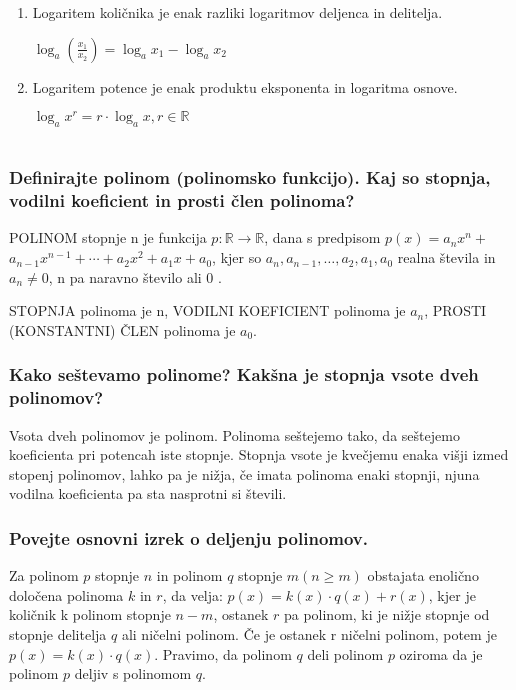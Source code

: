 \documentclass{article}
\begin{document}
\begin{enumerate}
  \item Logaritem količnika je enak razliki logaritmov deljenca in delitelja.

$\log _{a}\left(\frac{x_{1}}{x_{2}}\right)=\log _{a} x_{1}-\log _{a} x_{2}$

  \item Logaritem potence je enak produktu eksponenta in logaritma osnove.

  $\log _{a} x^{r}=r \cdot \log _{a} x, r \in \mathbb{R}$
\end{enumerate}

\section{\texorpdfstring{}{Polinomi}}
\subsubsection*{Definirajte polinom (polinomsko funkcijo). Kaj so stopnja, vodilni koeficient in prosti člen polinoma?}

POLINOM stopnje $\mathrm{n}$ je funkcija $p: \mathbb{R} \rightarrow \mathbb{R}$, dana s predpisom $p(x)=a_{n} x^{n}+$ $a_{n-1} x^{n-1}+\cdots+a_{2} x^{2}+a_{1} x+a_{0}$, kjer so $a_{n}, a_{n-1}, \ldots, a_{2}, a_{1}, a_{0}$ realna števila in $a_{n} \neq 0$, n pa naravno število ali 0 .

STOPNJA polinoma je $\mathrm{n}$, VODILNI KOEFICIENT polinoma je $a_{n}$, PROSTI (KONSTANTNI) ČLEN polinoma je $a_{0}$.

\subsubsection*{Kako seštevamo polinome? Kakšna je stopnja vsote dveh polinomov?}

Vsota dveh polinomov je polinom. Polinoma seštejemo tako, da seštejemo koeficienta pri potencah iste stopnje. Stopnja vsote je kvečjemu enaka višji izmed stopenj polinomov, lahko pa je nižja, če imata polinoma enaki stopnji, njuna vodilna koeficienta pa sta nasprotni si števili.

\subsubsection*{Povejte osnovni izrek o deljenju polinomov.}

Za polinom $p$ stopnje $n$ in polinom $q$ stopnje $m(n \geq m)$ obstajata enolično določena polinoma $k$ in $r$, da velja: $p(x)=k(x) \cdot q(x)+r(x)$, kjer je količnik k polinom stopnje $n-m$, ostanek $r$ pa polinom, ki je nižje stopnje od stopnje delitelja $q$ ali ničelni polinom. Če je ostanek r ničelni polinom, potem je $p(x)=k(x) \cdot q(x)$. Pravimo, da polinom $q$ deli polinom $p$ oziroma da je polinom $p$ deljiv s polinomom $q$.
\end{document}

